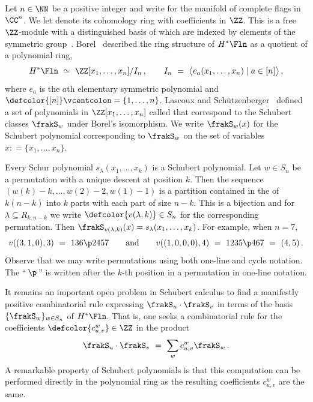 Let $n\in\NN$ be  a positive integer and write  for the manifold of complete flags in $\CC^n$.
We let  denote its cohomology ring with coefficients in $\ZZ$.
This is a free $\ZZ$-module with a distinguished basis
 of  which are indexed by elements of the symmetric group~. 
Borel~\cite{Borel} described the ring structure of $H^*\Fln$ as a quotient of a polynomial ring,
 \begin{equation}
    \label{borel-presentation}
    H^* \Fln\ \simeq\ \ZZ[x_1,\dotsc,x_n] / I_n\,,
    \qquad I_n\ =\ \big\langle e_a(x_1,\dotsc,x_n)\mid a \in [n] \big\rangle\,,
 \end{equation}
where $e_a$ is the $a$th elementary symmetric polynomial and
$\defcolor{[n]}\vcentcolon=\{1,\dots,n\}$.
Lascoux and Sch\"utzen\-ber\-ger~\cite{LaSch82} defined a set of polynomials in
$\ZZ[x_1, \ldots, x_n]$ called  that correspond to
the Schubert classes $\frakS_w$ under Borel's isomorphism.
We write $\frakS_w(x)$ for the Schubert polynomial corresponding to $\frakS_w$
on the set of variables $x: = \{x_1, \ldots, x_n\}$.

Every Schur polynomial $s_\lambda(x_1, \ldots, x_k)$ is a Schubert polynomial.
Let $w\in S_n$ be a permutation with a unique descent at position $k$.
Then the sequence $(w(k){-}k,\dotsc, w(2){-}2,w(1){-}1)$ is a partition contained in the  of $k(n{-}k)$ into $k$ parts with each part of
size $n{-}k$.
This is a bijection and
for $\lambda \subseteq R_{k, n-k}$ we write $\defcolor{v(\lambda,k)}\in S_n$ for
the corresponding permutation.
Then $\frakS_{v(\lambda, k)}(x) = s_\lambda(x_1, \ldots, x_k)$.
For example, when $n=7$,  
\begin{equation}
  v((3,1,0),3)\ =\ 136\p2457
  \qquad\mbox{and}\qquad
  v((1,0,0,0),4)\ =\ 1235\p467\ =\ (4,5)\,.
\end{equation}
Observe that we may write permutations using both one-line and cycle notation.
The ``\,$\p$\,'' is written after the $k$-th position in a permutation in one-line notation.
  
It remains an important open problem in Schubert calculus to
find a manifestly positive combinatorial rule expressing $\frakS_u \cdot \frakS_v$
in terms of the basis $\{ \frakS_w \}_{w \in S_n}$ of $H^*\Fln$.
That is, one seeks a combinatorial rule for the coefficients
$\defcolor{c_{u,v}^{w}}\in\ZZ$ in the product
\begin{equation}
    \label{eq:classical-coeffs}
    \frakS_u \cdot \frakS_v\ =\ \sum_{w} c_{u, v}^{w} \frakS_w\,.
\end{equation}
A remarkable property of Schubert polynomials is that this computation can
be performed directly in the polynomial ring as the resulting coefficients
$c_{u, v}^w$ are the same.

